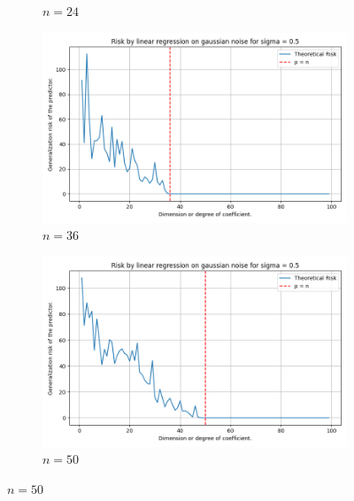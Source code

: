 \documentclass{article}
\begin{document}
\begin{figure}[htb]
\begin{subfigure}[b]{\imgwidth}
    \caption{$n=24$}\label{fig:1b21}
  \end{subfigure}%
  \hfill
  \begin{subfigure}[b]{\imgwidth}
    \includegraphics[width=\linewidth]{img/descent_devel_t3.png}
    \caption{$n=36$}\label{fig:1c21}
  \end{subfigure}%
  \hfill
  \begin{subfigure}[b]{\imgwidth}
    \includegraphics[width=\linewidth]{img/descent_devel_t4.png}
    \caption{$n=50$}\label{fig:1d21}
  \end{subfigure}

  \medskip


\end{figure}
\end{document}
